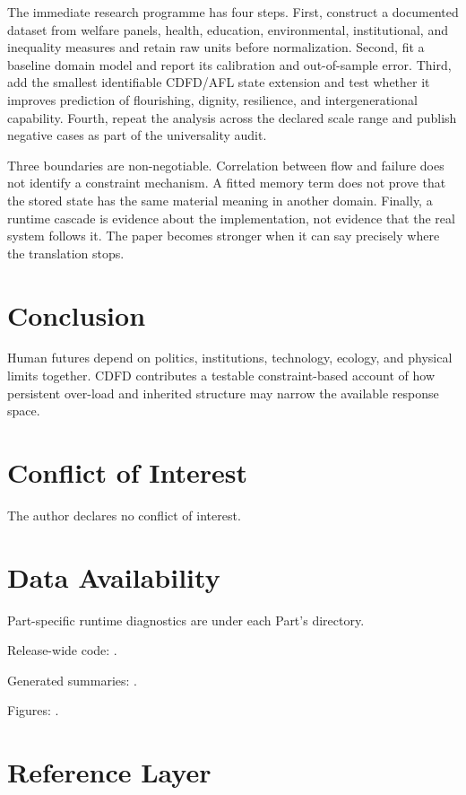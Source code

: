 \documentclass[11pt,a4paper]{article}
\begin{document}
The immediate research programme has four steps. First, construct a documented
dataset from welfare panels, health, education, environmental, institutional, and inequality measures and retain raw units before normalization.
Second, fit a baseline domain model and report its calibration and out-of-sample
error. Third, add the smallest identifiable CDFD/AFL state extension and test
whether it improves prediction of flourishing, dignity, resilience, and intergenerational capability. Fourth, repeat the
analysis across the declared scale range and publish negative cases as part of
the universality audit.

Three boundaries are non-negotiable. Correlation between flow and failure does
not identify a constraint mechanism. A fitted memory term does not prove that
the stored state has the same material meaning in another domain. Finally, a
runtime cascade is evidence about the implementation, not evidence that the
real system follows it. The paper becomes stronger when it can say precisely
where the translation stops.



\section{Conclusion}
Human futures depend on politics, institutions, technology, ecology, and physical limits together. CDFD contributes a testable constraint-based account of how persistent over-load and inherited structure may narrow the available response space.
\section*{Conflict of Interest} The author declares no conflict of interest.
\section*{Data Availability}
Part-specific runtime diagnostics are under each Part's  directory.

Release-wide code: .

Generated summaries: .

Figures: .


\section{Reference Layer}


\end{document}
